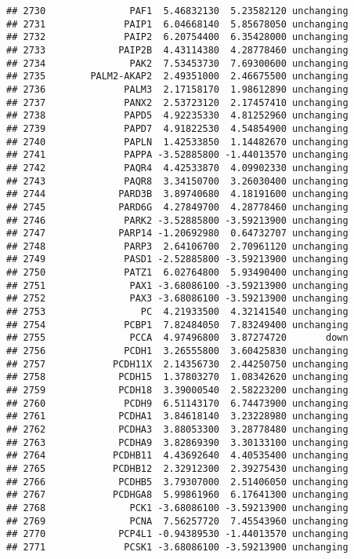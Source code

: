 \documentclass[]{article}
\begin{document}
\begin{verbatim}
## 2730               PAF1  5.46832130  5.23582120 unchanging
## 2731              PAIP1  6.04668140  5.85678050 unchanging
## 2732              PAIP2  6.20754400  6.35428000 unchanging
## 2733             PAIP2B  4.43114380  4.28778460 unchanging
## 2734               PAK2  7.53453730  7.69300600 unchanging
## 2735        PALM2-AKAP2  2.49351000  2.46675500 unchanging
## 2736              PALM3  2.17158170  1.98612890 unchanging
## 2737              PANX2  2.53723120  2.17457410 unchanging
## 2738              PAPD5  4.92235330  4.81252960 unchanging
## 2739              PAPD7  4.91822530  4.54854900 unchanging
## 2740              PAPLN  1.42533850  1.14482670 unchanging
## 2741              PAPPA -3.52885800 -1.44013570 unchanging
## 2742              PAQR4  4.42533870  4.09902330 unchanging
## 2743              PAQR8  3.34150700  3.26030400 unchanging
## 2744             PARD3B  3.89740680  4.18191600 unchanging
## 2745             PARD6G  4.27849700  4.28778460 unchanging
## 2746              PARK2 -3.52885800 -3.59213900 unchanging
## 2747             PARP14 -1.20692980  0.64732707 unchanging
## 2748              PARP3  2.64106700  2.70961120 unchanging
## 2749              PASD1 -2.52885800 -3.59213900 unchanging
## 2750              PATZ1  6.02764800  5.93490400 unchanging
## 2751               PAX1 -3.68086100 -3.59213900 unchanging
## 2752               PAX3 -3.68086100 -3.59213900 unchanging
## 2753                 PC  4.21933500  4.32141540 unchanging
## 2754              PCBP1  7.82484050  7.83249400 unchanging
## 2755               PCCA  4.97496800  3.87274720       down
## 2756              PCDH1  3.26555800  3.60425830 unchanging
## 2757            PCDH11X  2.14356730  2.44250750 unchanging
## 2758             PCDH15  1.37803270  1.08342620 unchanging
## 2759             PCDH18  3.39000540  2.58223200 unchanging
## 2760              PCDH9  6.51143170  6.74473900 unchanging
## 2761             PCDHA1  3.84618140  3.23228980 unchanging
## 2762             PCDHA3  3.88053300  3.28778480 unchanging
## 2763             PCDHA9  3.82869390  3.30133100 unchanging
## 2764            PCDHB11  4.43692640  4.40535400 unchanging
## 2765            PCDHB12  2.32912300  2.39275430 unchanging
## 2766             PCDHB5  3.79307000  2.51406050 unchanging
## 2767            PCDHGA8  5.99861960  6.17641300 unchanging
## 2768               PCK1 -3.68086100 -3.59213900 unchanging
## 2769               PCNA  7.56257720  7.45543960 unchanging
## 2770             PCP4L1 -0.94389530 -1.44013570 unchanging
## 2771              PCSK1 -3.68086100 -3.59213900 unchanging

\end{verbatim}
\end{document}
